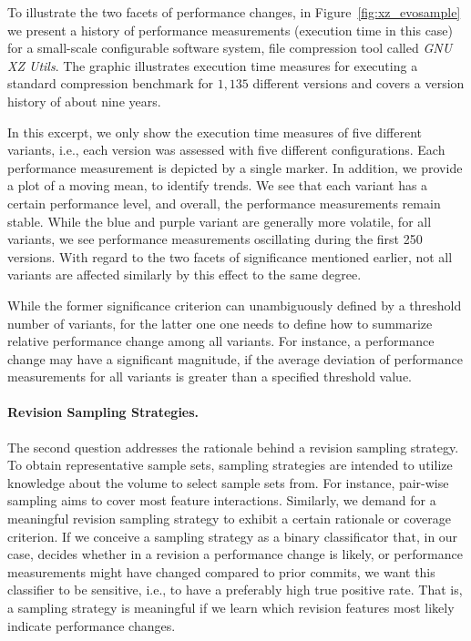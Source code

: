 To illustrate the two facets of performance changes, in
Figure~\ref{fig:xz_evosample} we present a history of performance measurements
(execution time in this case) for a small-scale configurable software system,
file compression tool called \emph{GNU XZ Utils}. The graphic illustrates
execution time measures for executing a standard compression benchmark for $1,135$
different versions and covers a version history of about nine years. 

In this excerpt, we only show the execution time measures of five different
variants, i.e., each version was assessed with five different configurations.
Each performance measurement is depicted by a single marker. In addition, we
provide a plot of a moving mean, to identify trends. We see that each variant
has a certain performance level, and overall, the performance measurements
remain stable. While the blue and purple variant are generally more volatile,
for all variants, we see performance measurements oscillating during the first
250 versions. With regard to the two facets of significance mentioned earlier,
not all variants are affected similarly by this effect to the same degree.

While the former significance criterion can unambiguously defined by a threshold
number of variants, for the latter one one needs to define how to summarize
relative performance change among all variants. For instance, a performance
change may have a significant magnitude, if the average deviation of
performance measurements for all variants is greater than a specified threshold
value.

\paragraph{Revision Sampling Strategies.} The second question addresses the
rationale behind a revision sampling strategy. To obtain representative sample sets, sampling
strategies are intended to utilize knowledge about the volume to select
sample sets from. For instance, pair-wise sampling aims to cover most feature
interactions. Similarly, we demand for a meaningful revision sampling strategy
to exhibit a certain rationale or coverage criterion. If we conceive a sampling
strategy as a binary classificator that, in our case, decides whether in a
revision a performance change is likely, or performance measurements might have
changed compared to prior commits, we want  this classifier to be sensitive,
i.e., to have a preferably high true positive rate. That is, a sampling
strategy is meaningful if we learn which revision features most likely indicate
performance changes.\\

